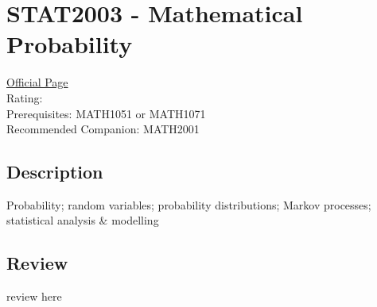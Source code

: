 \hypertarget{STAT2003}{\section{STAT2003 - Mathematical Probability}}

\large
\textcolor{turbo_purple}{\href{https://my.uq.edu.au/programs-courses/course.html?course_code=STAT2003}{Official Page}} \\
Rating: \cstar\cstar\cstar\cstar\ostar \\
Prerequisites: MATH1051 or MATH1071 \\
Recommended Companion: MATH2001

\normalsize
\subsection*{Description}
Probability; random variables; probability distributions; Markov processes; statistical analysis \& modelling

\subsection*{Review}
review here
